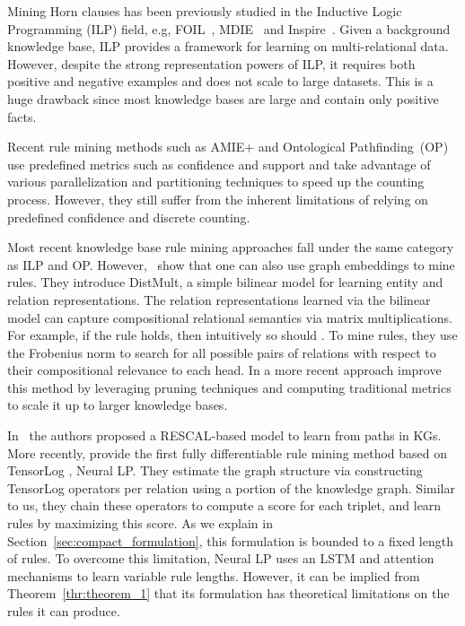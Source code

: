 \documentclass{article}
\begin{document}
Mining Horn clauses has been previously studied in the Inductive Logic Programming (ILP) field, e.g, FOIL~\cite{quinlan1990learning}, MDIE~\cite{muggleton1995inverse} and Inspire~\cite{schuller2018best}. Given a background knowledge base, ILP provides a framework for learning on multi-relational data. However, despite the strong representation powers of ILP, it requires both positive and negative examples and does not scale to large datasets. This is a huge drawback since most knowledge bases are large and contain only positive facts.

Recent rule mining methods such as AMIE+ \cite{galarraga2015fast} and Ontological Pathfinding~(OP)~\cite{chen2016ontological} use predefined metrics such as confidence and support and take advantage of various parallelization and partitioning techniques to speed up the counting process. However, they still suffer from the inherent limitations of relying on predefined confidence and discrete counting.


Most recent knowledge base rule mining approaches fall under the same category as ILP and OP. However,~\citet{Yang2015EmbeddingEA} show that one can also use graph embeddings to mine rules. They introduce DistMult, a simple bilinear model for learning entity and relation representations. The relation representations learned via the bilinear model can capture compositional relational semantics via matrix multiplications. For example, if the rule  holds, then intuitively so should . To mine rules, they use the Frobenius norm to search for all possible pairs of relations with respect to their compositional relevance to each head. In a more recent approach \citet{omran2018scalable} improve this method by leveraging pruning techniques and computing traditional metrics to scale it up to larger knowledge bases.

In~\cite{guu2015traversing} the authors proposed a RESCAL-based model to learn from paths in KGs. More recently, \citet{yang2017differentiable} provide the first fully differentiable rule mining method based on TensorLog \citep{cohen2016tensorlog}, Neural LP. They estimate the graph structure via constructing TensorLog operators per relation using a portion of the knowledge graph. Similar to us, they chain these operators to compute a score for each triplet, and learn rules by maximizing this score. As we explain in Section~\ref{sec:compact_formulation}, this formulation is bounded to a fixed length of rules. To overcome this limitation, Neural LP uses an LSTM and attention mechanisms to learn variable rule lengths. However, it can be implied from Theorem~\ref{thr:theorem_1} that its formulation has theoretical limitations on the rules it can produce.
\end{document}
